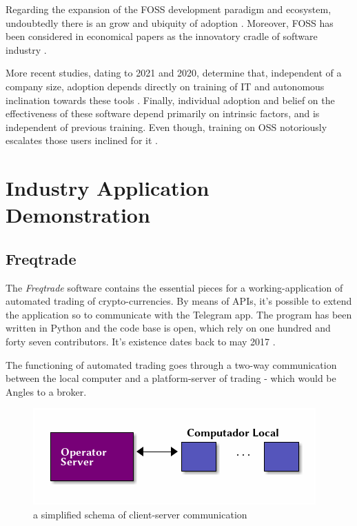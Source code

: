 \documentclass[
12pt,				%
openright,			%
oneside,			%
a4paper,			%
brazil,				%
english,			  %
]{abntex2}
\begin{document}
Regarding the expansion of the FOSS development paradigm and
ecosystem, undoubtedly there is an grow and ubiquity of adoption
\cite{schmidt2016agile}. Moreover, FOSS has been considered in
economical papers as the innovatory cradle of software industry \cite{schrape2019open,schmidt2016agile}.

More recent studies, dating to 2021 and 2020, determine that,
independent of a company size, adoption depends directly on training
of IT and autonomous inclination towards these tools
\cite{racero2020predicting}. Finally, individual adoption and belief
on the effectiveness of these software depend primarily on intrinsic
factors, and is independent of previous training. Even though,
training on OSS notoriously escalates those users inclined for it \cite{racero2021can}.       

\section{Industry Application Demonstration}
\subsection{Freqtrade}
The \emph{Freqtrade} software contains the essential pieces for a
working-application of automated trading of crypto-currencies. By
means of APIs, it's possible to extend the application so to
communicate with the Telegram app. The program has been written in
Python and the code base is open, which rely on one hundred and
forty seven contributors. It's existence dates back to may 2017 \cite{fang2020cryptocurrency}.



The functioning of automated trading goes through a two-way
communication between the local computer and a platform-server of
trading - which would be Angles to a broker.

\begin{figure}[ht]
  \centering
    \caption{\label{fig:diagrama-freqtrade} a simplified schema of
      client-server communication}
  \includegraphics[width=0.6\linewidth]{Imagens/server-client-fq_4.png}
\end{figure}
\end{document}
